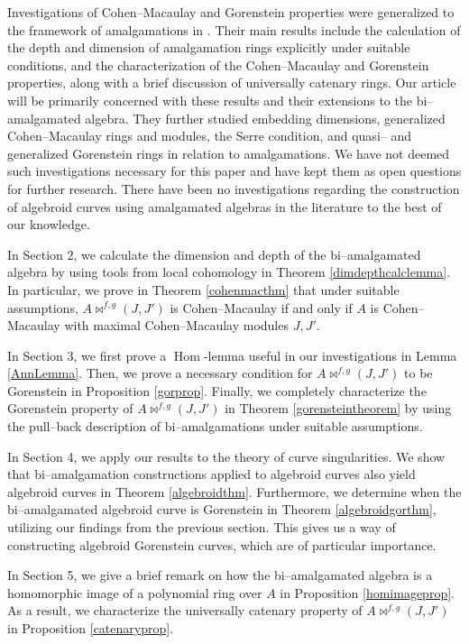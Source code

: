 \documentclass{amsart}%
\theoremstyle{plain}
\numberwithin{equation}{section}
\theoremstyle{definition}
\DeclareMathOperator{\Hom}{Hom}
\begin{document}
Investigations of Cohen--Macaulay and Gorenstein properties were generalized to the framework of amalgamations in \cite{iranlilar,DFF3}. Their main results include the calculation of the depth and dimension of amalgamation rings explicitly under suitable conditions, and the characterization of the Cohen--Macaulay and Gorenstein properties, along with a brief discussion of universally catenary rings. Our article will be primarily concerned with these results and their extensions to the bi--amalgamated algebra. They further studied embedding dimensions, generalized Cohen--Macaulay rings and modules, the Serre condition, and quasi-- and generalized Gorenstein rings in relation to amalgamations. We have not deemed such investigations necessary for this paper and have kept them as open questions for further research. There have been no investigations regarding the construction of algebroid curves using amalgamated algebras in the literature to the best of our knowledge.\medskip

In Section 2, we calculate the dimension and depth of the bi--amalgamated algebra by using tools from local cohomology in Theorem \ref{dimdepthcalclemma}. In particular, we prove in Theorem \ref{cohenmacthm} that under suitable assumptions, $A\bowtie^{f,g}(J,J')$ is Cohen--Macaulay if and only if $A$ is Cohen--Macaulay with maximal Cohen--Macaulay modules $J, J'$.\medskip

In Section 3, we first prove a $\Hom$-lemma useful in our investigations in Lemma \ref{AnnLemma}. Then, we prove a necessary condition for $A\bowtie^{f,g}(J,J')$ to be Gorenstein in Proposition \ref{gorprop}. Finally, we completely characterize the Gorenstein property of $A\bowtie^{f,g}(J,J')$ in Theorem \ref{gorensteintheorem} by using the pull--back description of bi--amalgamations under suitable assumptions. \medskip

In Section 4, we apply our results to the theory of curve singularities. We show that bi--amalgamation constructions applied to algebroid curves also yield algebroid curves in Theorem \ref{algebroidthm}. Furthermore, we determine when the bi--amalgamated algebroid curve is Gorenstein in Theorem \ref{algebroidgorthm}, utilizing our findings from the previous section. This gives us a way of constructing algebroid Gorenstein curves, which are of particular importance.\medskip

In Section 5, we give a brief remark on how the bi--amalgamated algebra is a homomorphic image of a polynomial ring over $A$ in Proposition \ref{homimageprop}. As a result, we characterize the universally catenary property of $A\bowtie^{f,g}(J,J')$ in Proposition \ref{catenaryprop}. \medskip
\end{document}
